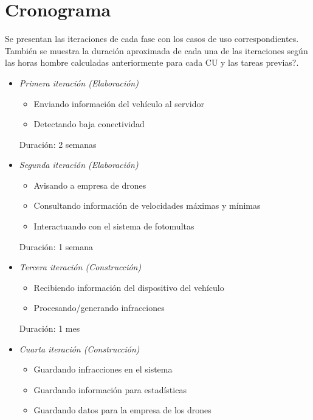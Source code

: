 \section{Cronograma}

Se presentan las iteraciones de cada fase con los casos de uso correspondientes. 
También se muestra la duración aproximada de cada una de las iteraciones según las
horas hombre calculadas anteriormente para cada CU y las tareas previas?.

\begin{itemize}

\item \textit{Primera iteración (Elaboración)}
\begin{itemize}
\item Enviando información del vehículo al servidor
\item Detectando baja conectividad
\end{itemize}

Duración: 2 semanas

\item \textit{Segunda iteración (Elaboración)}
\begin{itemize}
\item Avisando a empresa de drones
\item Consultando información de velocidades máximas y mínimas
\item Interactuando con el sistema de fotomultas
\end{itemize}

Duración: 1 semana

\item \textit{Tercera iteración (Construcción)}
\begin{itemize}
\item Recibiendo información del dispositivo del vehículo
\item Procesando/generando infracciones
\end{itemize}

Duración: 1 mes

\item \textit{Cuarta iteración (Construcción)}
\begin{itemize}
\item Guardando infracciones en el sistema 
\item Guardando información para estadísticas 
\item Guardando datos para la empresa de los drones 
\end{itemize}


\end{itemize}
